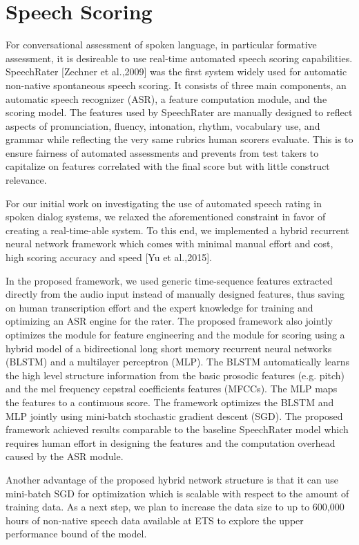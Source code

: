 \documentclass{article} %
\begin{document}
\section{Speech Scoring}
For conversational assessment of spoken language, in particular formative assessment, it is desireable to use real-time automated speech scoring capabilities.
SpeechRater [Zechner et al.,2009] was the first system widely used for automatic non-native spontaneous speech scoring.  It consists of three main components, an automatic speech recognizer (ASR), a feature computation module, and the scoring model. The features used by SpeechRater are  manually designed to reflect aspects of pronunciation, fluency, intonation, rhythm, vocabulary use, and grammar while reflecting the very same rubrics human scorers evaluate.  This is to ensure fairness of automated assessments and prevents from test takers to capitalize on features correlated with the final score but with little construct relevance.

For our initial work on investigating the use of automated speech rating in spoken dialog systems, we relaxed the aforementioned constraint in favor of creating a real-time-able system.  To this end, we implemented a hybrid recurrent neural network framework which comes with minimal manual effort and cost, high scoring accuracy and speed [Yu et al.,2015].

In the proposed framework, we used generic time-sequence features extracted directly from the audio input instead of manually designed features, thus saving on human transcription effort and the expert knowledge for training and optimizing an ASR engine for the rater. The proposed framework also jointly optimizes the module for feature engineering and the module for scoring using a hybrid model of a bidirectional long short memory recurrent neural networks (BLSTM) and a multilayer perceptron (MLP). The BLSTM automatically learns the high level structure information from the basic prosodic features (e.g. pitch) and the mel frequency cepstral coefficients features (MFCCs). The MLP maps the features to a continuous score. The framework optimizes the BLSTM and MLP jointly using mini-batch stochastic gradient descent (SGD). The proposed framework achieved results comparable to the baseline SpeechRater model which requires human effort in designing the features and the computation overhead caused by the ASR module.

Another advantage of the proposed hybrid network structure is that it can use mini-batch SGD for optimization which is scalable with respect to the amount of training data. As a next step, we plan to increase the data size to up to 600,000 hours of non-native speech data available at ETS to explore the upper performance bound of the model.
\end{document}
